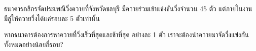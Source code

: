 \question{}

ธนาคารกสิกรจัดประเพณีวิ่งควายที่จังหวัดชลบุรี มีควายร่วมเข้าแข่งขันวิ่งจำนวน 45 ตัว 
แต่ภายในงานมีลู่ให้ควายวิ่งได้แค่รอบละ 5 ตัวเท่านั้น

หากธนาคารต้องการหาควายที่วิ่ง\uline{เร็วที่สุด}และ\uline{ช้าที่สุด} อย่างละ 1 ตัว เราจะต้องนำควายมาจัดวิ่งแข่งกันทั้งหมดอย่างน้อยกี่รอบ?
